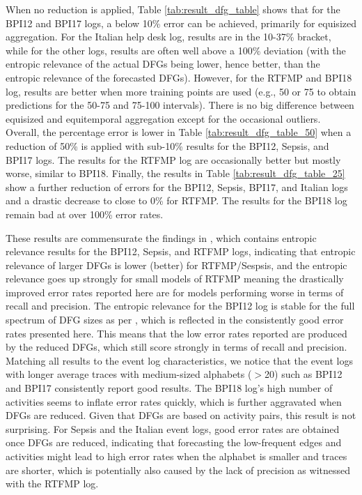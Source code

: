 When no reduction is applied, Table \ref{tab:result_dfg_table} shows that for the BPI12 and BPI17 logs, a below 10\% error can be achieved, primarily for equisized aggregation. 
For the Italian help desk log, results are in the 10-37\% bracket, while for the other logs, results are often well above a 100\% deviation (with the entropic relevance of the actual DFGs being lower, hence better, than the entropic relevance of the forecasted DFGs).
However, for the RTFMP and BPI18 log, results are better when more training points are used (e.g., 50 or 75 to obtain predictions for the 50-75 and 75-100 intervals).
There is no big difference between equisized and equitemporal aggregation except for the occasional outliers.
Overall, the percentage error is lower in Table \ref{tab:result_dfg_table_50} when a reduction of 50\% is applied with sub-10\% results for the BPI12, Sepsis, and BPI17 logs. 
The results for the RTFMP log are occasionally better but mostly worse, similar to BPI18.
Finally, the results in Table \ref{tab:result_dfg_table_25} show a further reduction of errors for the BPI12, Sepsis, BPI17, and Italian logs and a drastic decrease to close to 0\% for RTFMP.
The results for the BPI18 log remain bad at over 100\% error rates.

These results are commensurate the findings in \cite{DBLP:conf/icpm/PolyvyanyyMG20}, which contains entropic relevance results for the BPI12, Sepsis, and RTFMP logs, indicating that entropic relevance of larger DFGs is lower (better) for RTFMP/Sespsis, and the entropic relevance goes up strongly for small models of RTFMP meaning the drastically improved error rates reported here are for models performing worse in terms of recall and precision.
The entropic relevance for the BPI12 log is stable for the full spectrum of DFG sizes as per \cite{DBLP:conf/icpm/PolyvyanyyMG20}, which is reflected in the consistently good error rates presented here.
This means that the low error rates reported are produced by the reduced DFGs, which still score strongly in terms of recall and precision.
Matching all results to the event log characteristics, we notice that the event logs with longer average traces with medium-sized alphabets ($>$20) such as BPI12 and BPI17 consistently report good results.
The BPI18 log's high number of activities seems to inflate error rates quickly, which is further aggravated when DFGs are reduced.
Given that DFGs are based on activity pairs, this result is not surprising.
For Sepsis and the Italian event logs, good error rates are obtained once DFGs are reduced, indicating that forecasting the low-frequent edges and activities might lead to high error rates when the alphabet is smaller and traces are shorter, which is potentially also caused by the lack of precision as witnessed with the RTFMP log.

